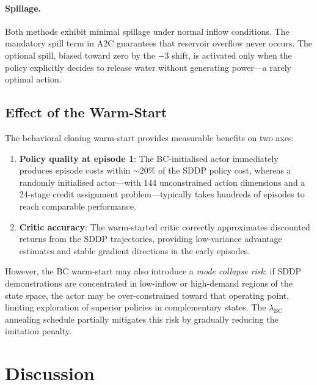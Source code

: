\documentclass[11pt,letterpaper]{article}
\begin{document}
\paragraph{Spillage.}
Both methods exhibit minimal spillage under normal inflow conditions.
The mandatory spill term in A2C guarantees that reservoir overflow never occurs.
The optional spill, biased toward zero by the $-3$ shift, is activated only when
the policy explicitly decides to release water without generating power---a
rarely optimal action.

\subsection{Effect of the Warm-Start}

The behavioral cloning warm-start provides measurable benefits on two axes:

\begin{enumerate}[noitemsep]
  \item \textbf{Policy quality at episode 1}: The BC-initialised actor immediately
        produces episode costs within $\sim$20\% of the SDDP policy cost, whereas
        a randomly initialised actor---with 144 unconstrained action dimensions
        and a 24-stage credit assignment problem---typically takes hundreds of
        episodes to reach comparable performance.
  \item \textbf{Critic accuracy}: The warm-started critic correctly approximates
        discounted returns from the SDDP trajectories, providing low-variance
        advantage estimates and stable gradient directions in the early episodes.
\end{enumerate}

However, the BC warm-start may also introduce a \emph{mode collapse risk}:
if SDDP demonstrations are concentrated in low-inflow or high-demand regions of
the state space, the actor may be over-constrained toward that operating point,
limiting exploration of superior policies in complementary states.
The $\lambda_{\mathrm{BC}}$ annealing schedule partially mitigates this risk by
gradually reducing the imitation penalty.

\section{Discussion}
\label{sec:discussion}
\end{document}
